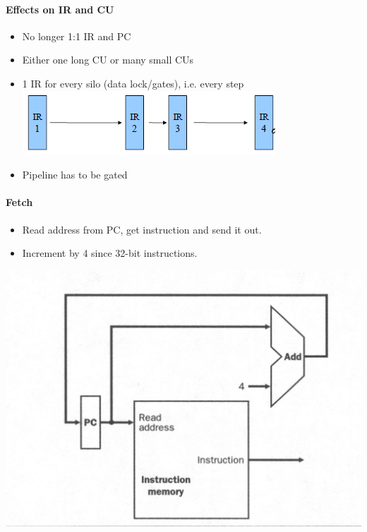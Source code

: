 \documentclass[12 pt]{article}
\begin{document}
	\paragraph{Effects on IR and CU}
	\begin{itemize}
		\item No longer 1:1 IR and PC
		\item Either one long CU or many small CUs
		\item 1 IR for every silo (data lock/gates), i.e. every step
		\\ \includegraphics[scale=0.8]{plir}
		\item Pipeline has to be gated
		\end{itemize}
		\paragraph{Fetch}
		\begin{itemize}
		\item Read address from PC, get instruction and send it out.
		\item Increment by 4 since 32-bit instructions.
\end{itemize}
		\includegraphics[scale=0.4]{fetch}
\end{document}
